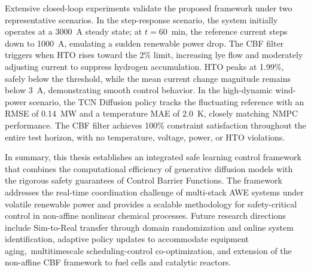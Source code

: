 \begin{digest}[en]
Extensive closed-loop experiments validate the proposed framework under two representative scenarios. In the step-response scenario, the system initially operates at a 3000~A steady state; at $t=60$~min, the reference current steps down to 1000~A, emulating a sudden renewable power drop. The CBF filter triggers when HTO rises toward the 2\% limit, increasing lye flow and moderately adjusting current to suppress hydrogen accumulation. HTO peaks at 1.99\%, safely below the threshold, while the mean current change magnitude remains below 3~A, demonstrating smooth control behavior. In the high-dynamic wind-power scenario, the TCN Diffusion policy tracks the fluctuating reference with an RMSE of 0.14~MW and a temperature MAE of 2.0~K, closely matching NMPC performance. The CBF filter achieves 100\% constraint satisfaction throughout the entire test horizon, with no temperature, voltage, power, or HTO violations.

In summary, this thesis establishes an integrated safe learning control framework that combines the computational efficiency of generative diffusion models with the rigorous safety guarantees of Control Barrier Functions. The framework addresses the real-time coordination challenge of multi-stack AWE systems under volatile renewable power and provides a scalable methodology for safety-critical control in non-affine nonlinear chemical processes. Future research directions include Sim-to-Real transfer through domain randomization and online system identification, adaptive policy updates to accommodate equipment aging,~multi\-timescale scheduling-control co-optimization, and extension of the non-affine CBF framework to fuel cells and catalytic reactors.
\end{digest}
